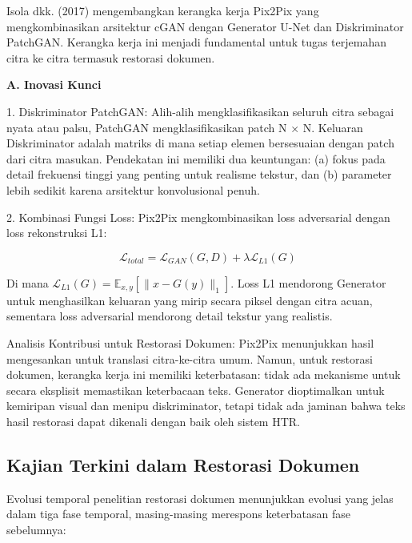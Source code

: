 \documentclass[12pt,a4paper]{article}
\begin{document}
\vspace{1.5ex}

Isola dkk. (2017) mengembangkan kerangka kerja Pix2Pix yang mengkombinasikan arsitektur cGAN dengan Generator U-Net dan Diskriminator PatchGAN. Kerangka kerja ini menjadi fundamental untuk tugas terjemahan citra ke citra termasuk restorasi dokumen.

\vspace{0.5ex}
\noindent\textbf{A. Inovasi Kunci}

1. Diskriminator PatchGAN: Alih-alih mengklasifikasikan seluruh citra sebagai nyata atau palsu, PatchGAN mengklasifikasikan patch N × N. Keluaran Diskriminator adalah matriks di mana setiap elemen bersesuaian dengan patch dari citra masukan. Pendekatan ini memiliki dua keuntungan: (a) fokus pada detail frekuensi tinggi yang penting untuk realisme tekstur, dan (b) parameter lebih sedikit karena arsitektur konvolusional penuh.

2. Kombinasi Fungsi Loss: Pix2Pix mengkombinasikan loss adversarial dengan loss rekonstruksi L1:

\begin{equation}
\mathcal{L}_{total} = \mathcal{L}_{GAN}(G, D) + \lambda \mathcal{L}_{L1}(G)
\end{equation}

Di mana $\mathcal{L}_{L1}(G) = \mathbb{E}_{x, y}[\|x - G(y)\|_1]$. Loss L1 mendorong Generator untuk menghasilkan keluaran yang mirip secara piksel dengan citra acuan, sementara loss adversarial mendorong detail tekstur yang realistis.

Analisis Kontribusi untuk Restorasi Dokumen: Pix2Pix menunjukkan hasil mengesankan untuk translasi citra-ke-citra umum. Namun, untuk restorasi dokumen, kerangka kerja ini memiliki keterbatasan: tidak ada mekanisme untuk secara eksplisit memastikan keterbacaan teks. Generator dioptimalkan untuk kemiripan visual dan menipu diskriminator, tetapi tidak ada jaminan bahwa teks hasil restorasi dapat dikenali dengan baik oleh sistem HTR.



\subsection{Kajian Terkini dalam Restorasi Dokumen}
\label{subsec:sota-analysis}

\vspace{1.5ex}

Evolusi temporal penelitian restorasi dokumen menunjukkan evolusi yang jelas dalam tiga fase temporal, masing-masing merespons keterbatasan fase sebelumnya:
\end{document}
